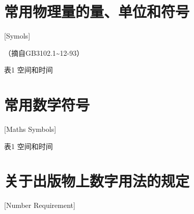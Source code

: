 \chapter{常用物理量的量、单位和符号}[Symols]

\centerline{（摘自GB3102.1\textasciitilde12-93）}

表1 空间和时间


\chapter{常用数学符号}[Maths Symbols]

表1 空间和时间

\chapter{关于出版物上数字用法的规定}[Number Requirement]

